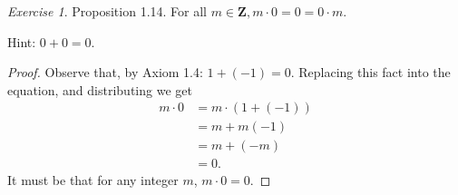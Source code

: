 \documentclass[12pt,oneside]{amsart}
\theoremstyle{remark}
\newtheorem{exer}{Exercise}
\begin{document}
\newpage
\begin{exer}
Proposition 1.14. For all $m \in \mathbf{Z}, m \cdot 0 = 0 = 0 \cdot m$.

Hint: $0 + 0 = 0.$
\end{exer}

\begin{proof}
Observe that, by Axiom 1.4: $1 + (-1) = 0$. Replacing this fact into the equation, and distributing we get
\begin{align*}
m \cdot 0 &= m \cdot (1 + (-1)) \\
          &= m + m(-1) \tag{Axiom 1.1.3} \\
          &= m + (-m) \tag{Axiom 1.1.3} \\
          &= 0. \tag{Axiom 1.4}
\end{align*}
It must be that for any integer $m$, $m \cdot 0 = 0$.
\end{proof}
\end{document}
